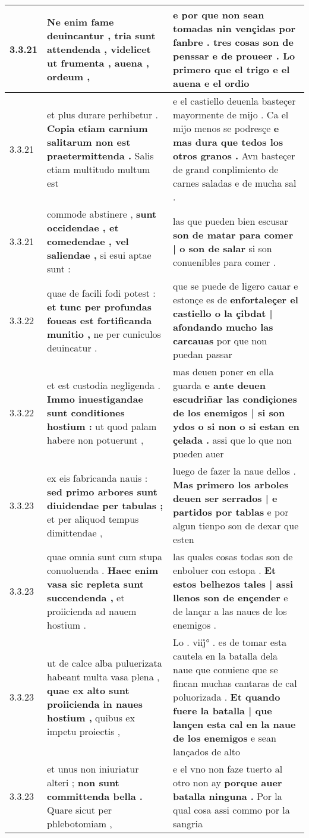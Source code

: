 \begin{tabular}{|p{1cm}|p{6.5cm}|p{6.5cm}|}
3.3.21 & Ne enim fame deuincantur , \textbf{ tria sunt attendenda , } videlicet ut frumenta , auena , ordeum , & e por que non sean tomadas nin vençidas por fanbre . \textbf{ tres cosas son de penssar e de proueer . } Lo primero que el trigo e el auena e el ordio \\\hline
3.3.21 & et plus durare perhibetur . \textbf{ Copia etiam carnium salitarum non est praetermittenda . } Salis etiam multitudo multum est & e el castiello deuenla basteçer mayormente de mijo . Ca el mijo menos se podresçe \textbf{ e mas dura que tedos los otros granos . } Avn basteçer de grand conplimiento de carnes saladas e de mucha sal . \\\hline
3.3.21 & commode abstinere , \textbf{ sunt occidendae , et comedendae , vel saliendae , } si esui aptae sunt : & las que pueden bien escusar \textbf{ son de matar para comer | o son de salar } si son conuenibles para comer . \\\hline
3.3.22 & quae de facili fodi potest : \textbf{ et tunc per profundas foueas est fortificanda munitio , } ne per cuniculos deuincatur . & que se puede de ligero cauar e estonçe es de \textbf{ enfortaleçer el castiello o la çibdat | afondando mucho las carcauas } por que non puedan passar \\\hline
3.3.22 & et est custodia negligenda . \textbf{ Immo inuestigandae sunt conditiones hostium : } ut quod palam habere non potuerunt , & mas deuen poner en ella guarda \textbf{ e ante deuen escudriñar las condiçiones de los enemigos | si son ydos o si non o si estan en çelada . } assi que lo que non pueden auer \\\hline
3.3.23 & ex eis fabricanda nauis : \textbf{ sed primo arbores sunt diuidendae per tabulas ; } et per aliquod tempus dimittendae , & luego de fazer la naue dellos . \textbf{ Mas primero los arboles deuen ser serrados | e partidos por tablas } e por algun tienpo son de dexar que esten \\\hline
3.3.23 & quae omnia sunt cum stupa conuoluenda . \textbf{ Haec enim vasa sic repleta sunt succendenda , } et proiicienda ad nauem hostium . & las quales cosas todas son de enboluer con estopa . \textbf{ Et estos belhezos tales | assi llenos son de ençender } e de lançar a las naues de los enemigos . \\\hline
3.3.23 & ut de calce alba puluerizata habeant multa vasa plena , \textbf{ quae ex alto sunt proiicienda in naues hostium , } quibus ex impetu proiectis , & Lo . viij̇° . es de tomar esta cautela en la batalla dela naue que conuiene que se fincan muchas cantaras de cal poluorizada . \textbf{ Et quando fuere la batalla | que lançen esta cal en la naue de los enemigos } e sean lançados de alto \\\hline
3.3.23 & et unus non iniuriatur alteri ; \textbf{ non sunt committenda bella . } Quare sicut per phlebotomiam , & e el vno non faze tuerto al otro non ay \textbf{ porque auer batalla ninguna . } Por la qual cosa assi commo por la sangria \\\hline

\end{tabular}

